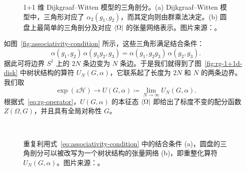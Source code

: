 \begin{figure}[htb]
  \centering
   \quad
  \caption[1+1 维 Dijkgraaf--Witten 模型的三角剖分]{1+1 维 Dijkgraaf--Witten 模型的三角剖分。(a) Dijkgraaf--Witten 模型中，三角形对应了 $\alpha_2(g_1, g_2)$，而其定向则由群乘法决定。(b) 圆盘上最简单的三角剖分及对应 $\bra{\Omega}$ 的张量网络表示。图片来源：\parencite{chen2022exact}。}
\end{figure}

如图~\ref{fig:associativity-condition} 所示，这些三角形满足结合条件：
\begin{equation}
  \alpha(g_1, g_2) \, \alpha(g_1 g_2, g_3) = \alpha(g_1, g_2 g_3) \, \alpha(g_2, g_3).
  \label{eq:associativity-condition}
\end{equation}
据此可将边界 $S^1$ 上的 $2N$ 条边变为 $N$ 条边。于是我们就得到了图~\ref{fig:rg-1+1d-disk} 中树状结构的算符 $U_N(G,\alpha)$，它联系起了长度为 $2N$ 和 $N$ 的两条边界。我们取
\begin{equation}
  \exp(z\mathcal{H}) \to U(G,\alpha) \coloneq \lim_{N\to\infty} U_N(G,\alpha).
\end{equation}
根据式~\eqref{eq:rg-operator}，$U(G,\alpha)$ 的本征态 $\bra{\Omega}$ 即给出了标度不变的配分函数 $Z(\Omega,G)$，并且具有全局对称性 $G$。

\begin{figure}[htb]
  \centering
   \\
  \caption[结合条件与树状结构的张量网络]{重复利用式~\eqref{eq:associativity-condition} 中的结合条件 (a)，圆盘的三角剖分可以被改写为一个树状结构的张量网络 (b)，即重整化算符 $U_N(G,\alpha)$。图片来源：\parencite{chen2022exact,zeng2023bulk}。}
\end{figure}

